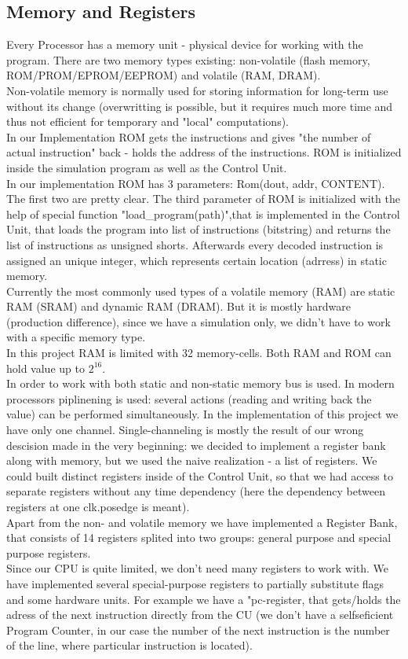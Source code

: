 \documentclass[11pt,a4paper]{article}
\begin{document}
\subsection{Memory and Registers}
Every Processor has a memory unit - physical device for working with the program. There are two memory types existing: non-volatile (flash memory,  ROM/PROM/EPROM/EEPROM) and volatile (RAM, DRAM).\\
Non-volatile memory is normally used for storing information for long-term use without its change (overwritting is possible, but it requires much more time and thus not efficient for temporary and "local" computations).\\
In our Implementation ROM gets the instructions and gives "the number of actual instruction" back - holds the address of the instructions. ROM is initialized inside the simulation program as well as the Control Unit.\\
In our implementation ROM has 3 parameters: Rom(dout, addr, CONTENT). The first two are pretty clear. The third parameter of ROM is initialized with the help of special function "load\_program(path)",that is implemented in the Control Unit, that loads the program into list of instructions (bitstring) and returns the list of instructions as unsigned shorts. Afterwards every decoded instruction is assigned an  unique integer, which represents certain location (adrress) in static memory.\\
Currently the most commonly used types of a volatile memory (RAM) are static RAM (SRAM) and dynamic RAM (DRAM). But it is mostly hardware (production difference), since we have a simulation only, we didn't have to work with a specific memory type.\\
In this project RAM is limited with 32 memory-cells. Both RAM and ROM can hold value up to $2^{16}$. \\
In order to  work with both static and non-static memory bus is used. In modern processors piplinening is used: several actions (reading and writing back the value) can be performed simultaneously.
In the implementation of this project we have only one channel. Single-channeling is mostly the result of our wrong descision made in the very beginning: we decided to implement a register bank along with memory, but we used the naive realization - a list of registers. We could built distinct registers inside of the Control Unit, so that we had access to separate registers without any time dependency (here the dependency between registers at one clk.posedge is meant).\\ 
Apart from the non- and volatile memory we have implemented a Register Bank, that consists of 14 registers splited into two groups: general purpose and special purpose registers.\\
Since our CPU is quite limited, we don't need many registers to work with. We have implemented several special-purpose registers to partially substitute flags and some hardware units. For example we have a "pc-register, that gets/holds the adress of the next instruction directly from the CU (we don't have a selfseficient Program Counter, in our case the number of the next instruction is the number of the line, where particular instruction is located).\\
\end{document}
